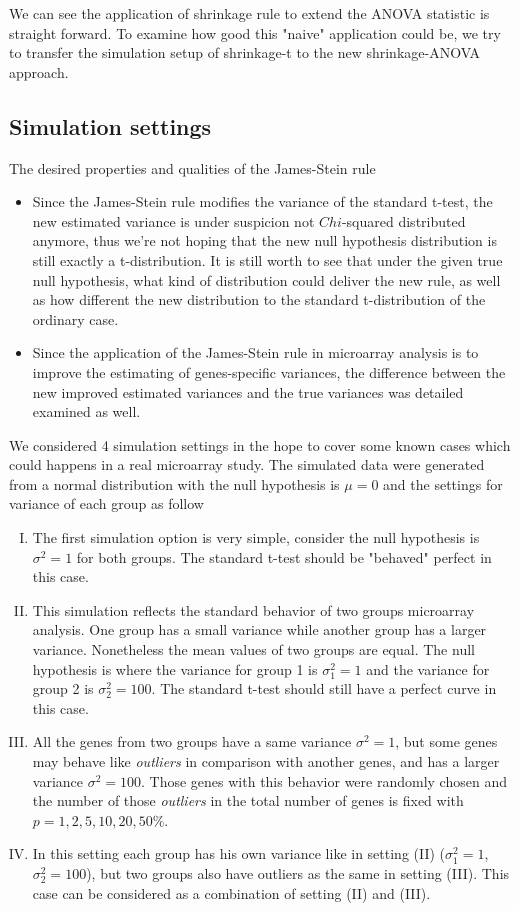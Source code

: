 We can see the application of shrinkage rule to extend the ANOVA statistic is straight forward. To examine how good this "naive" application could be, we try to transfer the simulation setup of shrinkage-t to the new shrinkage-ANOVA approach.
\subsection{Simulation settings}
The desired properties and qualities of the James-Stein rule 
\begin{itemize}
	\item Since the James-Stein rule modifies the variance of the standard t-test, the new estimated variance is under suspicion not $Chi$-squared distributed anymore, thus we're not hoping that the new null hypothesis distribution is still exactly a t-distribution. It is still worth to see that under the given true null hypothesis, what kind of distribution could deliver the new rule, as well as how different the new distribution to the standard t-distribution of the ordinary case.
	\item Since the application of the James-Stein rule in microarray analysis is to improve the estimating of genes-specific variances, the difference between the new improved estimated variances and the true variances was detailed examined as well.
\end{itemize}	
We considered 4 simulation settings in the hope to cover some known cases which could happens in a real microarray study. The simulated data were generated from a normal distribution with the null hypothesis is $\mu = 0$ and the settings for variance of each group as follow
\begin{enumerate}[(I)]
	\item The first simulation option is very simple, consider the null hypothesis is $\sigma^2 = 1$ for both groups. The standard t-test should be "behaved" perfect in this case.
	\item This simulation reflects the standard behavior of two groups microarray analysis. One group has a small variance while another group has a larger variance. Nonetheless the mean values of two groups are equal. The null hypothesis is where the variance for group 1 is $\sigma_1^2 = 1$ and the variance for group 2 is $\sigma_2^2 = 100$. The standard t-test should still have a perfect curve in this case.
	\item All the genes from two groups have a same variance $\sigma^2 = 1$, but some genes may behave like {\it outliers} in comparison with another genes, and has a larger variance $\sigma^2 = 100$. Those genes with this behavior were randomly chosen and the number of those {\it outliers} in the total number of genes is fixed with $p = 1, 2, 5, 10, 20, 50\%$.
	\item In this setting each group has his own variance like in setting (II) ($\sigma_1^2 = 1$, $\sigma_2^2 = 100$), but two groups also have outliers as the same in setting (III). This case can be considered as a combination of setting (II) and (III).
\end{enumerate}	
